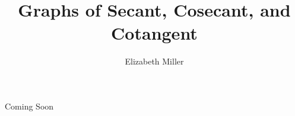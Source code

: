 \documentclass[nooutcomes, noauthor]{ximera}
\author{Elizabeth Miller}
\title{Graphs of Secant, Cosecant, and Cotangent}
\begin{document}
\licenseAPC
\begin{abstract}
  
\end{abstract}
\maketitle

Coming Soon

%
%
%
%
%
%
\end{document}
